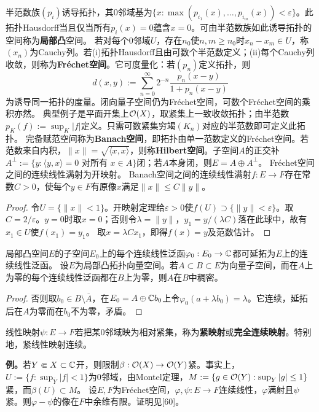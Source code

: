 半范数族$(p_i)$诱导拓扑，其0邻域基为$\{x:\max(p_{i_1}(x),\ldots,p_{i_m}(x))<\varepsilon\}$。此拓扑Hausdorff当且仅当所有$p_i(x)=0$蕴含$x=0$。可由半范数族如此诱导拓扑的空间称为\textbf{局部凸}空间。
若对每个0邻域$U$，存在$n_0$使$n,m\ge n_0$时$x_n-x_m\in U$，称$(x_n)$为Cauchy列。若(i)拓扑Hausdorff且由可数个半范数定义；(ii)每个Cauchy列收敛，则称为\textbf{Fréchet空间}。它可度量化：若$(p_n)$定义拓扑，则
\[
d(x,y):=\sum_{n=0}^\infty2^{-n}\frac{p_n(x-y)}{1+p_n(x-y)}
\]
为诱导同一拓扑的度量。闭向量子空间仍为Fréchet空间，可数个Fréchet空间的乘积亦然。
典型例子是平面开集上$\mathcal O(X)$，取紧集上一致收敛拓扑；由半范数$p_K(f):=\sup_K|f|$定义。只需可数紧集穷竭$(K_n)$对应的半范数即可定义此拓扑。
完备赋范空间称为\textbf{Banach空间}，即拓扑由单一范数定义的Fréchet空间。若范数来自内积，$\|x\|=\sqrt{\langle x,x\rangle}$，则称\textbf{Hilbert空间}。子空间$A$的正交补$A^\perp:=\{y:\langle y,x\rangle=0\text{ 对所有 }x\in A\}$闭；若$A$本身闭，则$E=A\oplus A^\perp$。
Fréchet空间之间的连续线性满射为开映射。
Banach空间之间的连续线性满射$f:E\to F$存在常数$C>0$，使每个$y\in F$有原像$x$满足$\|x\|\le C\|y\|$。
\begin{proof}
令$U=\{\|x\|<1\}$。开映射定理给$\varepsilon>0$使$f(U)\supset\{\|y\|<\varepsilon\}$。取$C=2/\varepsilon$。$y=0$时取$x=0$；否则令$\lambda=\|y\|$，$y_1=y/(\lambda C)$落在此球中，故有$x_1\in U$使$f(x_1)=y_1$。
取$x=\lambda Cx_1$，即得$f(x)=y$及范数估计。
\end{proof}
局部凸空间$E$的子空间$E_0$上的每个连续线性泛函$\varphi_0:E_0\to\mathbb C$都可延拓为$E$上的连续线性泛函。
设$E$为局部凸拓扑向量空间。若$A\subset B\subset E$为向量子空间，而在$A$上为零的每个连续线性泛函都在$B$上为零，则$A$在$B$中稠密。
\begin{proof}
否则取$b_0\in B\setminus\overline A$，在$E_0=A\oplus\mathbb C b_0$上令$\varphi_0(a+\lambda b_0)=\lambda$。它连续，延拓后在$A$为零而在$b_0$不为零，矛盾。
\end{proof}
线性映射$\psi:E\to F$若把某0邻域映为相对紧集，称为\textbf{紧映射}或\textbf{完全连续映射}。特别地，紧线性映射连续。

\textbf{例。}若$Y\Subset X\subset\mathbb C$开，则限制$\beta:\mathcal O(X)\to\mathcal O(Y)$紧。事实上，$U:=\{f:\sup_{\overline Y}|f|<1\}$为0邻域，由Montel定理，$M:=\{g\in\mathcal O(Y):\sup_Y|g|\le1\}$紧，而$\beta(U)\subset M$。
设$E,F$为Fréchet空间，$\varphi,\psi:E\to F$连续线性，$\varphi$满射且$\psi$紧。则$\varphi-\psi$的像在$F$中余维有限。证明见[60]。
